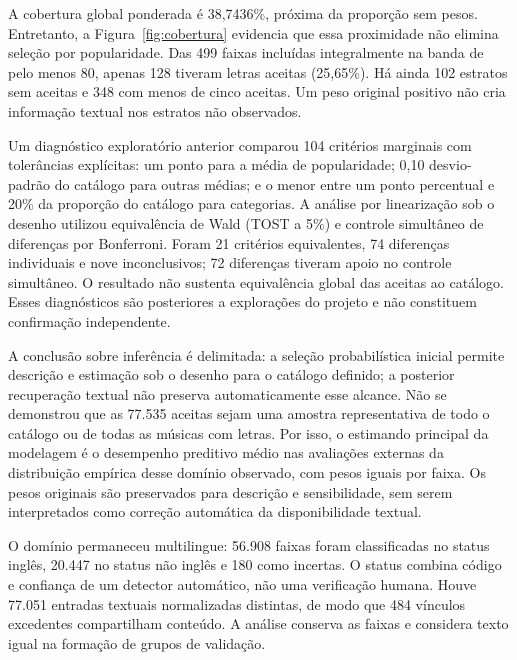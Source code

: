 

A cobertura global ponderada é 38,7436\%, próxima da proporção sem pesos. Entretanto, a Figura~\ref{fig:cobertura} evidencia que essa proximidade não elimina seleção por popularidade. Das 499 faixas incluídas integralmente na banda de pelo menos 80, apenas 128 tiveram letras aceitas (25,65\%). Há ainda 102 estratos sem aceitas e 348 com menos de cinco aceitas. Um peso original positivo não cria informação textual nos estratos não observados.


Um diagnóstico exploratório anterior comparou 104 critérios marginais com tolerâncias explícitas: um ponto para a média de popularidade; 0,10 desvio-padrão do catálogo para outras médias; e o menor entre um ponto percentual e 20\% da proporção do catálogo para categorias. A análise por linearização sob o desenho utilizou equivalência de Wald (TOST a 5\%) e controle simultâneo de diferenças por Bonferroni. Foram 21 critérios equivalentes, 74 diferenças individuais e nove inconclusivos; 72 diferenças tiveram apoio no controle simultâneo. O resultado não sustenta equivalência global das aceitas ao catálogo. Esses diagnósticos são posteriores a explorações do projeto e não constituem confirmação independente.

A conclusão sobre inferência é delimitada: a seleção probabilística inicial permite descrição e estimação sob o desenho para o catálogo definido; a posterior recuperação textual não preserva automaticamente esse alcance. Não se demonstrou que as 77.535 aceitas sejam uma amostra representativa de todo o catálogo ou de todas as músicas com letras. Por isso, o estimando principal da modelagem é o desempenho preditivo médio nas avaliações externas da distribuição empírica desse domínio observado, com pesos iguais por faixa. Os pesos originais são preservados para descrição e sensibilidade, sem serem interpretados como correção automática da disponibilidade textual.

O domínio permaneceu multilingue: 56.908 faixas foram classificadas no status inglês, 20.447 no status não inglês e 180 como incertas. O status combina código e confiança de um detector automático, não uma verificação humana. Houve 77.051 entradas textuais normalizadas distintas, de modo que 484 vínculos excedentes compartilham conteúdo. A análise conserva as faixas e considera texto igual na formação de grupos de validação.

